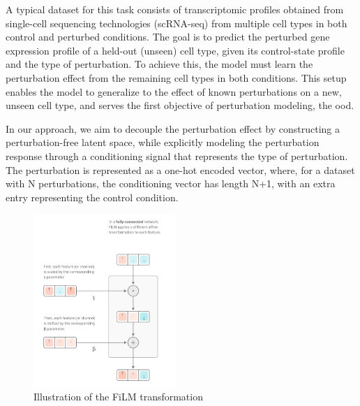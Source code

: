 \documentclass[12pt, a4paper]{article}
\begin{document}
 A typical dataset for this task consists of transcriptomic profiles obtained from
single-cell sequencing technologies (scRNA-seq) from multiple cell types in both control and
perturbed conditions. The goal is to predict the perturbed gene expression profile of a
held-out (unseen) cell type, given its control-state profile and the type of perturbation. To achieve this, the model must learn
the perturbation effect from the remaining cell types in both conditions. This setup enables the model to generalize to the effect of known perturbations on a new, unseen cell type, and serves the first objective of perturbation modeling, the \gls{ood}.



In our approach, we aim to decouple the perturbation effect by constructing a perturbation-free latent space, while explicitly modeling the perturbation response through a conditioning signal that represents the type of perturbation.
The perturbation is represented as a one-hot encoded vector, where, for a dataset with N perturbations, the conditioning vector has length N+1, with an extra entry representing the control condition.

\begin{figure}
  \begin{center}
    \includegraphics[width=0.48\textwidth]{film_layers.png}
  \end{center}
  \caption{Illustration of the FiLM transformation \cite{dumoulin2018feature-wise}}
\end{figure}
\end{document}
